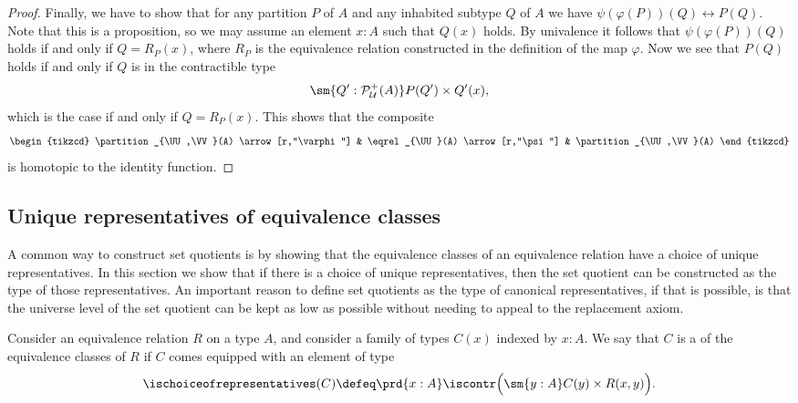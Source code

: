 \begin{proof}
  Finally, we have to show that for any partition $P$ of $A$ and any inhabited subtype $Q$ of $A$ we have $\psi(\varphi(P))(Q)\leftrightarrow P(Q)$. Note that this is a proposition, so we may assume an element $x:A$ such that $Q(x)$ holds. By univalence it follows that $\psi(\varphi(P))(Q)$ holds if and only if $Q=R_P(x)$, where $R_P$ is the equivalence relation constructed in the definition of the map $\varphi$. Now we see that $P(Q)$ holds if and only if $Q$ is in the contractible type
  \begin{equation*}
    \sm{Q':\mathcal{P}^+_{\mathcal{U}}(A)}P(Q')\times Q'(x),
  \end{equation*}
  which is the case if and only if $Q=R_P(x)$. This shows that the composite
  \begin{equation*}
    \begin{tikzcd}
      \partition_{\UU,\VV}(A) \arrow[r,"\varphi"] & \eqrel_{\UU}(A) \arrow[r,"\psi"] & \partition_{\UU,\VV}(A)
    \end{tikzcd}
  \end{equation*}
  is homotopic to the identity function.
\end{proof}

\subsection{Unique representatives of equivalence classes}

A common way to construct set quotients is by showing that the equivalence classes of an equivalence relation have a choice of unique representatives. In this section we show that if there is a choice of unique representatives, then the set quotient can be constructed as the type of those representatives. An important reason to define set quotients as the type of canonical representatives, if that is possible, is that the universe level of the set quotient can be kept as low as possible without needing to appeal to the replacement axiom.

\begin{defn}
  Consider an equivalence relation $R$ on a type $A$, and consider a family of types $C(x)$ indexed by $x:A$. We say that $C$ is a  of the equivalence classes of $R$ if $C$ comes equipped with an element of type
  \begin{equation*}
    \ischoiceofrepresentatives(C) \defeq \prd{x:A}\iscontr\Big(\sm{y:A}C(y)\times R(x,y)\Big).
  \end{equation*}
\end{defn}

